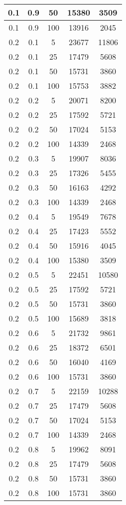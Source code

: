 \begin{appendices}
\begin{longtable}[c]{|c|c|c|c|c|}
	\hline
	0.1& 0.9& 50& 15380&  3509\\
	\hline
	0.1& 0.9& 100& 13916&  2045\\
	\hline
	0.2& 0.1& 5& 23677&  11806\\
	\hline
	0.2& 0.1& 25& 17479&  5608\\
	\hline
	0.2& 0.1& 50& 15731&  3860\\
	\hline
	0.2& 0.1& 100& 15753&  3882\\
	\hline
	0.2& 0.2& 5& 20071&  8200\\
	\hline
	0.2& 0.2& 25& 17592&  5721\\
	\hline
	0.2& 0.2& 50& 17024&  5153\\
	\hline
	0.2& 0.2& 100& 14339&  2468\\
	\hline
	0.2& 0.3& 5& 19907&  8036\\
	\hline
	0.2& 0.3& 25& 17326&  5455\\
	\hline
	0.2& 0.3& 50& 16163&  4292\\
	\hline
	0.2& 0.3& 100& 14339&  2468\\
	\hline
	0.2& 0.4& 5& 19549&  7678\\
	\hline
	0.2& 0.4& 25& 17423&  5552\\
	\hline
	0.2& 0.4& 50& 15916&  4045\\
	\hline
	0.2& 0.4& 100& 15380&  3509\\
	\hline
	0.2& 0.5& 5& 22451&  10580\\
	\hline
	0.2& 0.5& 25& 17592&  5721\\
	\hline
	0.2& 0.5& 50& 15731&  3860\\
	\hline
	0.2& 0.5& 100& 15689&  3818\\
	\hline
	0.2& 0.6& 5& 21732&  9861\\
	\hline
	0.2& 0.6& 25& 18372&  6501\\
	\hline
	0.2& 0.6& 50& 16040&  4169\\
	\hline
	0.2& 0.6& 100& 15731&  3860\\
	\hline
	0.2& 0.7& 5& 22159&  10288\\
	\hline
	0.2& 0.7& 25& 17479&  5608\\
	\hline
	0.2& 0.7& 50& 17024&  5153\\
	\hline
	0.2& 0.7& 100& 14339&  2468\\
	\hline
	0.2& 0.8& 5& 19962&  8091\\
	\hline
	0.2& 0.8& 25& 17479&  5608\\
	\hline
	0.2& 0.8& 50& 15731&  3860\\
	\hline
	0.2& 0.8& 100& 15731&  3860\\

\end{longtable}
\end{appendices}
